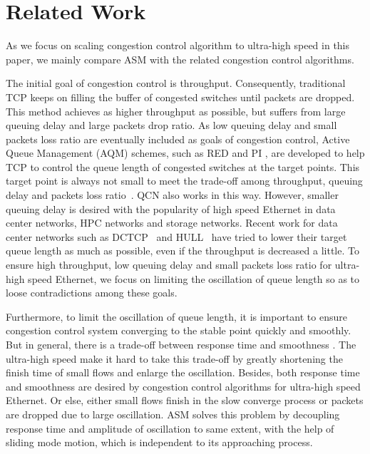 \documentclass{sig-alternate-10pt}
\begin{document}
\section{Related Work}
As we focus on scaling congestion control algorithm to ultra-high speed in this paper, we mainly compare ASM with the related congestion control algorithms. 

The initial goal of congestion control is throughput. Consequently, traditional TCP keeps on filling the buffer of congested switches until packets are dropped. This method achieves as higher throughput as possible, but suffers from large queuing delay and large packets drop ratio. As low queuing delay and small packets loss ratio are eventually included as goals of congestion control, Active Queue Management (AQM) schemes, such as RED  and PI , are developed to help TCP to control the queue length of congested switches at the target points. This target point is always not small to meet the trade-off among throughput, queuing delay and packets loss ratio~\cite{Metrics}. QCN also works in this way. However, smaller queuing delay is desired with the popularity of high speed Ethernet in data center networks, HPC networks and storage networks. Recent work for data center networks such as DCTCP~\cite{DCTCP} and HULL~\cite{HULL} have tried to lower their target queue length as much as possible, even if the throughput is decreased a little. To ensure high throughput, low queuing delay and small packets loss ratio for ultra-high speed Ethernet, we focus on limiting the oscillation of queue length so as to loose contradictions among these goals.


Furthermore, to limit the oscillation of queue length, it is important to ensure congestion control system converging to the stable point quickly and smoothly. But in general, there is a trade-off between response time and smoothness . The ultra-high speed make it hard to take this trade-off by greatly shortening the finish time of small flows and enlarge the oscillation. Besides, both response time and smoothness are desired by congestion control algorithms for ultra-high speed Ethernet. Or else, either small flows finish in the slow converge process or packets are dropped due to large oscillation. ASM solves this problem by decoupling response time and amplitude of oscillation to same extent, with the help of sliding mode motion, which is independent to its approaching process.
\end{document}
